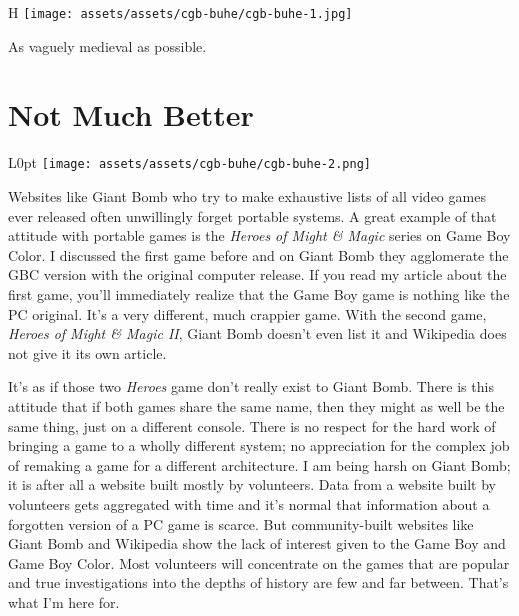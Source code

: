 \documentclass{book}
\begin{document}
\begin{wrapfigure}{H}{\linewidth}
\vskip 4pt
\centering \texttt{[image: assets/assets/cgb-buhe/cgb-buhe-1.jpg]}\par\pagetwodescription As vaguely medieval as possible.\end{wrapfigure}
\clearpage

\FloatBarrier\needspace{5pt}\section*{Not Much Better}\nopagebreak[4]

\begin{wrapfigure}{L}{0pt} \texttt{[image: assets/assets/cgb-buhe/cgb-buhe-2.png]}\end{wrapfigure}
Websites like Giant Bomb who try to make exhaustive lists of all video games ever released often unwillingly forget portable systems. A great example of that attitude with portable games is the \emph{Heroes of Might \& Magic} series on Game Boy Color. I discussed the first game before and on Giant Bomb they agglomerate the GBC version with the original computer release. If you read my article about the first game, you’ll immediately realize that the Game Boy game is nothing like the PC original. It’s a very different, much crappier game. With the second game, \emph{Heroes of Might \& Magic II}, Giant Bomb doesn’t even list it and Wikipedia does not give it its own article.

It’s as if those two \emph{Heroes} game don’t really exist to Giant Bomb. There is this attitude that if both games share the same name, then they might as well be the same thing, just on a different console. There is no respect for the hard work of bringing a game to a wholly different system; no appreciation for the complex job of remaking a game for a different architecture. I am being harsh on Giant Bomb; it is after all a website built mostly by volunteers. Data from a website built by volunteers gets aggregated with time and it’s normal that information about a forgotten version of a PC game is scarce. But community-built websites like Giant Bomb and Wikipedia show the lack of interest given to the Game Boy and Game Boy Color. Most volunteers will concentrate on the games that are popular and true investigations into the depths of history are few and far between. That’s what I’m here for.
\end{document}
